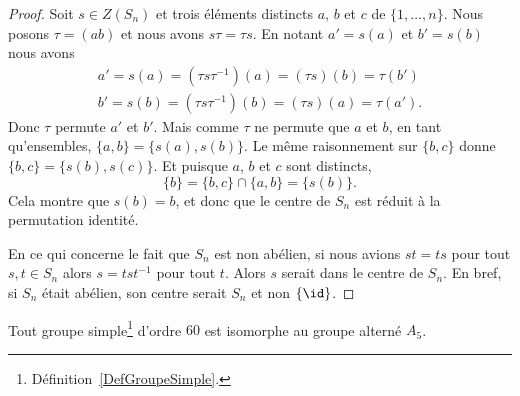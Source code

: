 \begin{proof}
    Soit \( s\in Z(S_n)\) et trois éléments distincts \( a\),  \( b\) et \( c\) de \( \{ 1,\ldots, n \}\). Nous posons \( \tau=(ab)\) et nous avons \( s\tau=\tau s\). En notant \( a'=s(a)\) et \( b'=s(b)\) nous avons
    \begin{subequations}
        \begin{align}
            a'=s(a)=(\tau s\tau^{-1})(a)=(\tau s)(b)=\tau(b')\\
            b'=s(b)=(\tau s\tau^{-1})(b)=(\tau s)(a)=\tau(a').
        \end{align}
    \end{subequations}
    Donc \( \tau\) permute \( a'\) et \( b'\). Mais comme \( \tau\) ne permute que \( a\) et \( b\), en tant qu'ensembles, \( \{ a,b \}=\{ s(a), s(b) \}\). Le même raisonnement sur \( \{ b,c \}\) donne $\{ b,c \}=\{ s(b),s(c) \}$. Et puisque \( a\), \( b\) et \( c\) sont distincts,
    \begin{equation}
        \{ b \}=\{ b,c \}\cap\{ a,b \}=\{ s(b) \}.
    \end{equation}
    Cela montre que \( s(b)=b\), et donc que le centre de \( S_n\) est réduit à la permutation identité.

    En ce qui concerne le fait que \( S_n\) est non abélien, si nous avions \( st=ts\) pour tout \( s,t\in S_n\) alors \( s=tst^{-1}\) pour tout \( t\). Alors \( s\) serait dans le centre de \( S_n\). En bref, si \( S_n\) était abélien, son centre serait \( S_n\) et non \( \{ \id \}\).

\end{proof}

\begin{proposition}        \label{PROPooUBIWooTrfCat}
    Tout groupe simple\footnote{Définition~\ref{DefGroupeSimple}.} d'ordre \( 60\) est isomorphe au groupe alterné \( A_5\).
\end{proposition}

